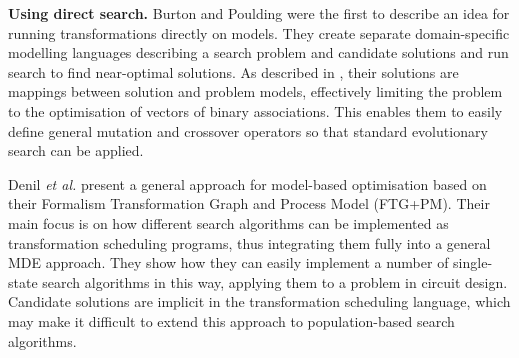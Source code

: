	  \textbf{Using direct search.}
%
			Burton and Poulding \cite{BurtonPoulding13} were the first to describe an idea for running transformations directly on models. They create separate 
			domain-specific modelling languages describing a search problem and candidate solutions and run search to find near-optimal solutions. As described in 
			\cite{Burton+12}, their solutions are mappings between solution and problem models, effectively limiting the problem to the optimisation of vectors of
			binary associations. This enables them to easily define general mutation and crossover operators so that standard evolutionary search can be applied.
			
			Denil \emph{et al.} \cite{Denil+14} present a general approach for model-based optimisation based on their Formalism Transformation Graph and Process Model 
			(FTG+PM). Their main focus is on how different search algorithms can be implemented as transformation scheduling programs, thus integrating them fully into
			a general MDE approach. They show how they can easily implement a number of single-state search algorithms in this way, applying them to a problem in
			circuit design. Candidate solutions are implicit in the transformation scheduling language, which may make it difficult to extend this approach to 
			population-based search algorithms.